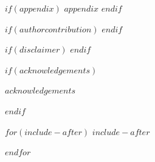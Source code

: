 \documentclass[$journal$, manuscript, $language$]{copernicus}
\begin{document}

$if(appendix)$
\appendix
$appendix$
\noappendix
$endif$

$if(authorcontribution)$
$endif$


$if(disclaimer)$
$endif$

$if(acknowledgements)$
\begin{acknowledgements}
$acknowledgements$
\end{acknowledgements}
$endif$








$for(include-after)$
$include-after$

$endfor$
\end{document}
